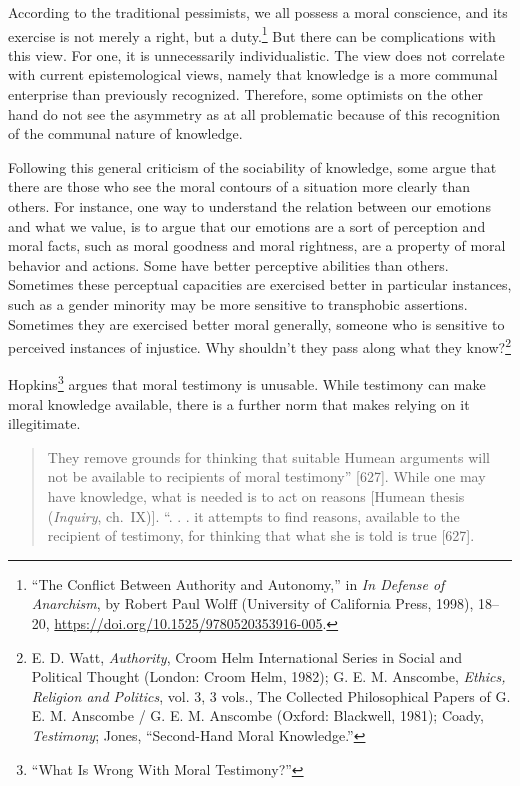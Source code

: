 \documentclass[phdthesis,12pt,final,a4paper]{wuthesis}
\theoremstyle{definition}
\theoremstyle{definition}
\theoremstyle{definition}
\theoremstyle{definition}
\theoremstyle{remark}
\begin{document}
According to the traditional pessimists, we all possess a moral conscience, and its exercise is not merely a right, but a duty.\footnote{{``The {Conflict Between Authority} and {Autonomy},''} in \emph{In {Defense} of {Anarchism}}, by Robert Paul Wolff (University of California Press, 1998), 18--20, \url{https://doi.org/10.1525/9780520353916-005}.} But there can be complications with this view. For one, it is unnecessarily individualistic. The view does not correlate with current epistemological views, namely that knowledge is a more communal enterprise than previously recognized. Therefore, some optimists on the other hand do not see the asymmetry as at all problematic because of this recognition of the communal nature of knowledge.

Following this general criticism of the sociability of knowledge, some argue that there are those who see the moral contours of a situation more clearly than others. For instance, one way to understand the relation between our emotions and what we value, is to argue that our emotions are a sort of perception and moral facts, such as moral goodness and moral rightness, are a property of moral behavior and actions. Some have better perceptive abilities than others. Sometimes these perceptual capacities are exercised better in particular instances, such as a gender minority may be more sensitive to transphobic assertions. Sometimes they are exercised better moral generally, someone who is sensitive to perceived instances of injustice. Why shouldn't they pass along what they know?\footnote{E. D. Watt, \emph{Authority}, Croom {Helm} International Series in Social and Political Thought (London: Croom Helm, 1982); G. E. M. Anscombe, \emph{Ethics, Religion and Politics}, vol. 3, 3 vols., The Collected Philosophical Papers of {G}. {E}. {M}. {Anscombe} / {G}. {E}. {M}. {Anscombe} (Oxford: Blackwell, 1981); Coady, \emph{Testimony}; Jones, {``Second-{Hand Moral Knowledge}.''}}

Hopkins\footnote{{``What {Is Wrong With Moral Testimony}?''}} argues that moral testimony is unusable. While testimony can make moral knowledge available, there is a further norm that makes relying on it illegitimate.

\begin{quote}
They remove grounds for thinking that suitable Humean arguments will not be available to recipients of moral testimony'' {[}627{]}. While one may have knowledge, what is needed is to act on reasons {[}Humean thesis (\emph{Inquiry}, ch.~IX){]}. ``. . . it attempts to find reasons, available to the recipient of testimony, for thinking that what she is told is true {[}627{]}.
\end{quote}
\end{document}
